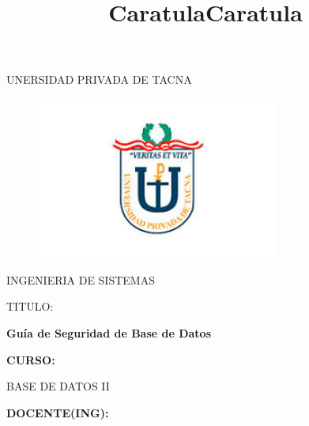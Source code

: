 \documentclass[12pt,letterpaper]{article}
\title{Caratula}
\begin{document}
\title{Caratula}

\begin{titlepage}
\begin{center}
\large{UNERSIDAD PRIVADA DE TACNA}\\
\vspace*{-0.025in}
\begin{figure}[htb]
\begin{center}
\includegraphics[width=8cm]{./IMG/logo}
\end{center}
\end{figure}
\vspace*{0.15in}
INGENIERIA DE SISTEMAS  \\

\vspace*{0.5in}
\begin{large}
TITULO:\\
\end{large}

\vspace*{0.1in}
\begin{Large}
\textbf{Guía de Seguridad de Base de Datos} \\
\end{Large}

\vspace*{0.3in}
\begin{Large}
\textbf{CURSO:} \\
\end{Large}

\vspace*{0.1in}
\begin{large}
BASE DE DATOS II\\
\end{large}

\vspace*{0.3in}
\begin{Large}
\textbf{DOCENTE(ING):} \\
\end{Large}


\end{center}
\end{titlepage}
\end{document}
